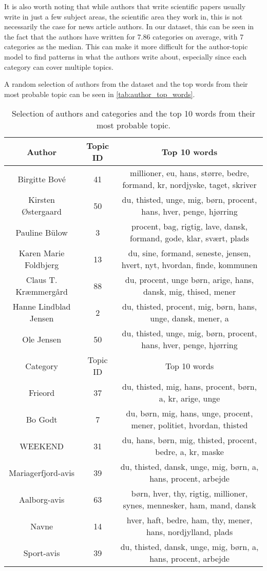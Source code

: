 It is also worth noting that while authors that write scientific papers usually write in just a few subject areas, the scientific area they work in, this is not necessarily the case for news article authors.
In our dataset, this can be seen in the fact that the authors have written for 7.86 categories on average, with 7 categories as the median.
This can make it more difficult for the author-topic model to find patterns in what the authors write about, especially since each category can cover multiple topics.

A random selection of authors from the dataset and the top words from their most probable topic can be seen in \autoref{tab:author_top_words}.

\begin{table*}[h]
	\centering
	\caption{Selection of authors and categories and the top 10 words from their most probable topic.}
	\begin{tabular}{c|c|c}
		\toprule
		Author & Topic ID & Top 10 words\\
		\midrule
		Birgitte Bové & 41 & millioner, eu, hans, større, bedre, formand, kr, nordjyske, taget, skriver \\
		Kirsten Østergaard & 50 & du, thisted, unge, mig, børn, procent, hans, hver, penge, hjørring \\
		Pauline Bülow & 3 & procent, bag, rigtig, lave, dansk, formand, gode, klar, svært, plads \\
		Karen Marie Foldbjerg & 13 & du, sine, formand, seneste, jensen, hvert, nyt, hvordan, finde, kommunen \\
		Claus T. Kræmmergård & 88 & du, procent, unge børn, arige, hans, dansk, mig, thised, mener \\
		Hanne Lindblad Jensen & 2 & du, thisted, procent, mig, børn, hans, unge, dansk, mener, a \\
		Ole Jensen & 50 & du, thisted, unge, mig, børn, procent, hans, hver, penge, hjørring \\
		\midrule
		Category & Topic ID & Top 10 words \\
		\midrule
		Frieord & 37 & du, thisted, mig, hans, procent, børn, a, kr, arige, unge \\
		Bo Godt & 7 & du, børn, mig, hans, unge, procent, mener, politiet, hvordan, thisted \\
		WEEKEND & 31 & du, hans, børn, mig, thisted, procent, bedre, a, kr, maske \\
		Mariagerfjord-avis & 39 & du, thisted, dansk, unge, mig, børn, a, hans, procent, arbejde \\
		Aalborg-avis & 63 & børn, hver, thy, rigtig, millioner, synes, mennesker, ham, mand, dansk \\
		Navne & 14 & hver, haft, bedre, ham, thy, mener, hans, nordjylland, plads \\
		Sport-avis & 39 & du, thisted, dansk, unge, mig, børn, a, hans, procent, arbejde \\
		\bottomrule
	\end{tabular}
	\label{tab:author_top_words}
\end{table*}
